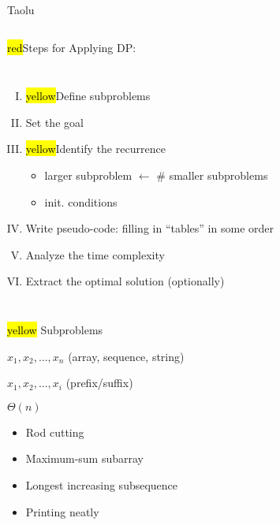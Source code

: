 
\begin{frame}{}
  \centerline{\Huge Taolu}
  \begin{columns}
  \end{columns}
\end{frame}

\begin{frame}{}
  \centerline{\hl{red}{\Large Steps for Applying DP:}}

  \pause
  \vspace{0.30cm}
  \begin{columns}
      \begin{enumerate}[(I)]
		\setlength{\itemsep}{8pt}
		\item \hl{yellow}{Define subproblems}
		\item Set the goal
		\item \hl{yellow}{Identify the recurrence}
		  \begin{itemize}
			\item larger subproblem $\gets$ \# smaller subproblems
			\item init. conditions
		  \end{itemize}
		\item Write pseudo-code: filling in ``tables'' in some order
		\item Analyze the time complexity
		\item Extract the optimal solution (optionally)
      \end{enumerate}
  \end{columns}
\end{frame}
\begin{frame}{}
  \centerline{\hl{yellow}{\Large {} Subproblems}}

  \vspace{0.50cm}
  \begin{description}[Subproblems:]
    \setlength{\itemsep}{8pt}
    \item[Input:] $x_1, x_2, \dots, x_n$ (array, sequence, string)
    \item[Subproblems:] $x_1, x_2, \dots, x_i$ (prefix/suffix)
    \item[\#:] $\Theta(n)$
    \item[Examples:] 
      \begin{itemize}
	\setlength{\itemsep}{4pt}
	\item Rod cutting
	\item Maximum-sum subarray
	\item Longest increasing subsequence
	\item Printing neatly
      \end{itemize}
  \end{description}
\end{frame}
